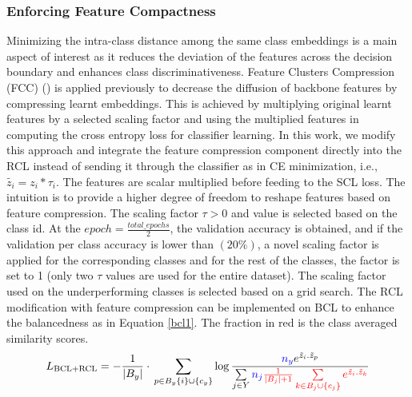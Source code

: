 \subsubsection{Enforcing Feature Compactness}
Minimizing the intra-class distance among the same class embeddings is a main aspect of interest as it reduces the deviation of the features across the decision boundary and enhances class discriminativeness. Feature Clusters Compression (FCC) (\cite{fcc}) is applied previously to decrease the diffusion of backbone features by compressing learnt embeddings. This is achieved by multiplying original learnt features by a selected scaling factor and using the multiplied
features in computing the cross entropy loss for classifier learning. In this work, we modify this approach and integrate the feature compression component directly into the RCL instead of sending it through the classifier as in CE minimization, i.e., $\tilde{z_i}=z_i * \tau_i$. The features are scalar multiplied before feeding to the SCL loss. The intuition is to provide a higher degree of freedom to reshape features based on feature compression. The scaling factor $\tau>0$ and value is selected based on the class id. At the $ epoch= \frac{total\_epochs}{2}$, the validation accuracy is obtained, and if the validation per class accuracy is lower than $(20\%)$, a novel scaling factor is applied for the corresponding classes and for the rest of the classes, the factor is set to 1 (only two $\tau$ values are used for the entire dataset). The scaling factor used on the underperforming classes is selected based on a grid search. The RCL modification with feature compression can be implemented on BCL to enhance the balancedness as in Equation \ref{bcl1}. The fraction in red is the class averaged similarity scores. 
\begin{equation}
L_{\text{BCL+RCL}}=-\frac{1}{|B_y|} \cdot \\ \sum\limits_{p\in {B_y \{i\}} \cup \{c_y\}}\log \frac{\mathcolor{blue}{n_y}e^{\tilde{z}_i.\tilde{z}_p}}{\sum\limits_{j\in Y} \mathcolor{blue}{n_j}\mathcolor{red}{\frac{1}{|B_j|+1}\sum\limits_{k \in B_j \cup \{c_j\}} e^{\tilde{z}_i.\tilde{z}_k}}}
\label{bcl1}
\end{equation}


